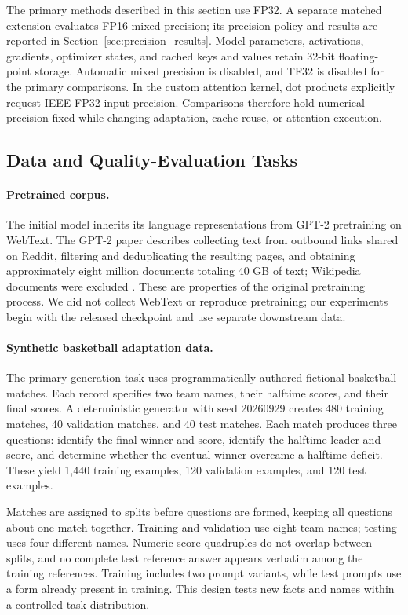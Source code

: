 The primary methods described in this section use FP32. A separate matched extension evaluates FP16 mixed precision; its precision policy and results are reported in Section~\ref{sec:precision_results}. Model parameters, activations, gradients, optimizer states, and cached keys and values retain 32-bit floating-point storage. Automatic mixed precision is disabled, and TF32 is disabled for the primary comparisons. In the custom attention kernel, dot products explicitly request IEEE FP32 input precision. Comparisons therefore hold numerical precision fixed while changing adaptation, cache reuse, or attention execution.

\subsection{Data and Quality-Evaluation Tasks}
\label{sec:method_data}

\paragraph{Pretrained corpus.}
The initial model inherits its language representations from GPT-2 pretraining on WebText. The GPT-2 paper describes collecting text from outbound links shared on Reddit, filtering and deduplicating the resulting pages, and obtaining approximately eight million documents totaling 40 GB of text; Wikipedia documents were excluded \cite{radford2019gpt2}. These are properties of the original pretraining process. We did not collect WebText or reproduce pretraining; our experiments begin with the released checkpoint and use separate downstream data.

\paragraph{Synthetic basketball adaptation data.}
The primary generation task uses programmatically authored fictional basketball matches. Each record specifies two team names, their halftime scores, and their final scores. A deterministic generator with seed 20260929 creates 480 training matches, 40 validation matches, and 40 test matches. Each match produces three questions: identify the final winner and score, identify the halftime leader and score, and determine whether the eventual winner overcame a halftime deficit. These yield 1,440 training examples, 120 validation examples, and 120 test examples.

Matches are assigned to splits before questions are formed, keeping all questions about one match together. Training and validation use eight team names; testing uses four different names. Numeric score quadruples do not overlap between splits, and no complete test reference answer appears verbatim among the training references. Training includes two prompt variants, while test prompts use a form already present in training. This design tests new facts and names within a controlled task distribution.


